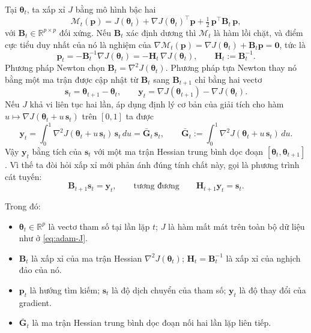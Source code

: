 Tại $\boldsymbol{\theta}_t$, ta xấp xỉ $J$ bằng mô hình bậc hai
\begin{equation}\label{eq:lb-model}
  \mathcal{M}_t(\mathbf{p})=J(\boldsymbol{\theta}_t)+\nabla J(\boldsymbol{\theta}_t)^{\top}\mathbf{p}+\tfrac{1}{2}\,\mathbf{p}^{\top}\mathbf{B}_t\,\mathbf{p},
\end{equation}
với $\mathbf{B}_t\in\mathbb{R}^{p\times p}$ đối xứng. Nếu $\mathbf{B}_t$ xác định dương thì $\mathcal{M}_t$ là hàm lồi chặt, và điểm cực tiểu duy nhất của nó là nghiệm của $\nabla\mathcal{M}_t(\mathbf{p})=\nabla J(\boldsymbol{\theta}_t)+\mathbf{B}_t\mathbf{p}=\mathbf{0}$, tức là
\begin{equation}\label{eq:lb-direction}
  \mathbf{p}_t=-\mathbf{B}_t^{-1}\nabla J(\boldsymbol{\theta}_t)=-\mathbf{H}_t\,\nabla J(\boldsymbol{\theta}_t),
  \qquad \mathbf{H}_t:=\mathbf{B}_t^{-1}.
\end{equation}
Phương pháp Newton chọn $\mathbf{B}_t=\nabla^2J(\boldsymbol{\theta}_t)$. Phương pháp tựa Newton thay nó bằng một ma trận được cập nhật từ $\mathbf{B}_t$ sang $\mathbf{B}_{t+1}$ chỉ bằng hai vectơ
\begin{equation}\label{eq:lb-sy}
  \mathbf{s}_t=\boldsymbol{\theta}_{t+1}-\boldsymbol{\theta}_t,
  \qquad
  \mathbf{y}_t=\nabla J(\boldsymbol{\theta}_{t+1})-\nabla J(\boldsymbol{\theta}_t).
\end{equation}
Nếu $J$ khả vi liên tục hai lần, áp dụng định lý cơ bản của giải tích cho hàm $u\mapsto\nabla J(\boldsymbol{\theta}_t+u\,\mathbf{s}_t)$ trên $[0,1]$ ta được
\begin{equation}\label{eq:lb-avg}
  \mathbf{y}_t=\int_0^1\nabla^2J(\boldsymbol{\theta}_t+u\,\mathbf{s}_t)\,\mathbf{s}_t\,du=\bar{\mathbf{G}}_t\,\mathbf{s}_t,
  \qquad
  \bar{\mathbf{G}}_t:=\int_0^1\nabla^2J(\boldsymbol{\theta}_t+u\,\mathbf{s}_t)\,du .
\end{equation}
Vậy $\mathbf{y}_t$ bằng tích của $\mathbf{s}_t$ với một ma trận Hessian trung bình dọc đoạn $[\boldsymbol{\theta}_t,\boldsymbol{\theta}_{t+1}]$. Vì thế ta đòi hỏi xấp xỉ mới phản ánh đúng tính chất này, gọi là phương trình cát tuyến:
\begin{equation}\label{eq:lb-secant}
  \mathbf{B}_{t+1}\mathbf{s}_t=\mathbf{y}_t,
  \qquad\text{tương đương}\qquad
  \mathbf{H}_{t+1}\mathbf{y}_t=\mathbf{s}_t .
\end{equation}

Trong đó:
\begin{itemize}
  \item $\boldsymbol{\theta}_t\in\mathbb{R}^{p}$ là vectơ tham số tại lần lặp $t$; $J$ là hàm mất mát trên toàn bộ dữ liệu như ở \eqref{eq:adam-J}.
  \item $\mathbf{B}_t$ là xấp xỉ của ma trận Hessian $\nabla^2J(\boldsymbol{\theta}_t)$; $\mathbf{H}_t=\mathbf{B}_t^{-1}$ là xấp xỉ của nghịch đảo của nó.
  \item $\mathbf{p}_t$ là hướng tìm kiếm; $\mathbf{s}_t$ là độ dịch chuyển của tham số; $\mathbf{y}_t$ là độ thay đổi của gradient.
  \item $\bar{\mathbf{G}}_t$ là ma trận Hessian trung bình dọc đoạn nối hai lần lặp liên tiếp.
\end{itemize}

